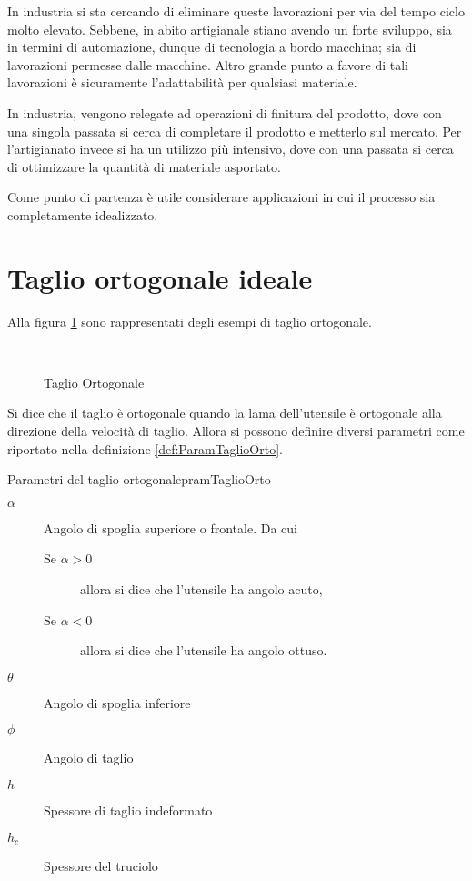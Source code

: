 In industria si sta cercando di eliminare queste lavorazioni per via del tempo ciclo molto elevato.
Sebbene, in abito artigianale stiano avendo un forte sviluppo, sia in termini di automazione,
dunque di tecnologia a bordo macchina; sia di lavorazioni permesse dalle macchine.
Altro grande punto a favore di tali lavorazioni è sicuramente l'adattabilità per 
qualsiasi materiale.

In industria, vengono relegate ad operazioni di finitura del prodotto, dove con una
singola passata si cerca di completare il prodotto e metterlo sul mercato.
Per l'artigianato invece si ha un utilizzo più intensivo, dove con una passata si cerca 
di ottimizzare la quantità di materiale asportato.

Come punto di partenza è utile considerare applicazioni in cui il processo sia completamente
idealizzato.

\section{Taglio ortogonale ideale}
Alla figura \ref{fig:TaglioOrto} sono rappresentati degli esempi di taglio ortogonale.

\begin{figure}
\centering
{}\\
\caption{Taglio Ortogonale}\label{fig:TaglioOrto}
\end{figure}
Si dice che il taglio è ortogonale quando la lama dell'utensile è ortogonale alla direzione della velocità di taglio.
Allora si possono definire diversi parametri come riportato nella definizione \ref{def:ParamTaglioOrto}.

\begin{definition}{Parametri del taglio ortogonale}{pramTaglioOrto}
\begin{description}
\item[$\alpha$] Angolo di spoglia superiore o frontale. Da cui
	\begin{description}
	\item[Se $\alpha > 0$] allora si dice che l'utensile ha angolo acuto,
	\item[Se $\alpha < 0$] allora si dice che l'utensile ha angolo ottuso.
	\end{description}
\item[$\theta$] Angolo di spoglia inferiore
\item[$\phi$] Angolo di taglio
\item[$h$] Spessore di taglio indeformato
\item[$h_c$] Spessore del truciolo
\end{description}
\label{def:ParamTaglioOrto}
\end{definition}

